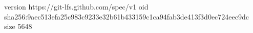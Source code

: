 version https://git-lfs.github.com/spec/v1
oid sha256:9aec513efa25c983c9233e32b61b433159c1ca94fab3de413f3d0ec724eec9dc
size 5648
